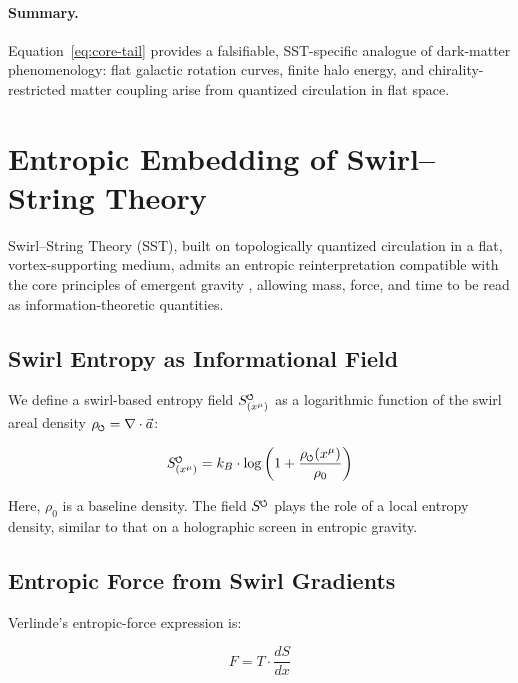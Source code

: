 \documentclass[11pt]{article}
\newcommand{\swirlarrow}{%
    \mathchoice{\mkern-2mu\scriptstyle\boldsymbol{\circlearrowleft}}%
    {\mkern-2mu\scriptstyle\boldsymbol{\circlearrowleft}}%
    {\mkern-2mu\scriptscriptstyle\boldsymbol{\circlearrowleft}}%
    {\mkern-2mu\scriptscriptstyle\boldsymbol{\circlearrowleft}}%
}
\begin{document}
    \paragraph{Summary.}
    Equation~\eqref{eq:core-tail} provides a falsifiable, SST-specific analogue of
    dark-matter phenomenology: flat galactic rotation curves, finite halo energy,
    and chirality-restricted matter coupling arise from quantized circulation in flat space.

\section{Entropic Embedding of Swirl–String Theory}
\label{sec:entropic-sst}
    Swirl–String Theory (SST), built on topologically quantized circulation in a flat, vortex-supporting medium, admits an entropic reinterpretation compatible with the core principles of emergent gravity \cite{verlinde2011origin,verlinde2016emergent,jacobson1995thermodynamics,padmanabhan2010thermodynamical,bekenstein1973black}, allowing mass, force, and time to be read as information-theoretic quantities.


    \subsection{Swirl Entropy as Informational Field}
        We define a swirl-based entropy field $S_{(x^\mu)}^{\swirlarrow} $ as a logarithmic function of the swirl areal density $\rho_{\swirlarrow} = \nabla \cdot \vec{a}$:

        \begin{equation}
            S_{(x^\mu)}^{\swirlarrow} = k_B \cdot \log\left(1 + \frac{\rho_{\swirlarrow}(x^\mu)}{\rho_0}\right)
        \end{equation}

        Here, $\rho_0$ is a baseline density. The field $S^{\swirlarrow} $ plays the role of a local entropy density, similar to that on a holographic screen in entropic gravity.

    \subsection{Entropic Force from Swirl Gradients}
        Verlinde’s entropic-force expression is:

        \begin{equation}
            F = T \cdot \frac{dS}{dx}
        \end{equation}
\end{document}
